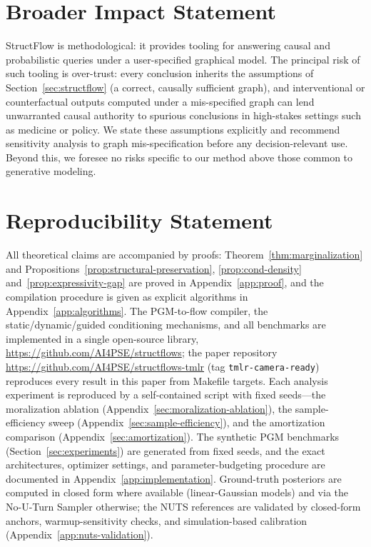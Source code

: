 \documentclass{article}
\theoremstyle{plain}
\theoremstyle{definition}
\theoremstyle{remark}
\newif\ifmarkcam \markcamtrue
\newcommand{\cam}[1]{\ifmarkcam{\color{camgreen}#1}\else#1\fi}
\begin{document}







\section*{Broader Impact Statement}

StructFlow is methodological: it provides tooling for answering causal and probabilistic queries under a user-specified graphical model. The principal risk of such tooling is over-trust: every conclusion inherits the assumptions of Section~\ref{sec:structflow} (a correct, causally sufficient graph), and interventional or counterfactual outputs computed under a mis-specified graph can lend unwarranted causal authority to spurious conclusions in high-stakes settings such as medicine or policy. We state these assumptions explicitly and recommend sensitivity analysis to graph mis-specification before any decision-relevant use. Beyond this, we foresee no risks specific to our method above those common to generative modeling.

\section*{Reproducibility Statement}

All theoretical claims are accompanied by proofs: Theorem~\ref{thm:marginalization} and Propositions~\ref{prop:structural-preservation}, \ref{prop:cond-density} and~\ref{prop:expressivity-gap} are proved in Appendix~\ref{app:proof}, and the compilation procedure is given as explicit algorithms in Appendix~\ref{app:algorithms}. The PGM-to-flow compiler, the static/dynamic/guided conditioning mechanisms, and all benchmarks are implemented in a single open-source library\cam{, \url{https://github.com/AI4PSE/structflows}; the paper repository \url{https://github.com/AI4PSE/structflows-tmlr} (tag \texttt{tmlr-camera-ready}) reproduces every result in this paper from Makefile targets}. Each analysis experiment is reproduced by a self-contained script with fixed seeds---the moralization ablation (Appendix~\ref{sec:moralization-ablation}), the sample-efficiency sweep (Appendix~\ref{sec:sample-efficiency}), and the amortization comparison (Appendix~\ref{sec:amortization}). The synthetic PGM benchmarks (Section~\ref{sec:experiments}) are generated from fixed seeds, and the exact architectures, optimizer settings, and parameter-budgeting procedure are documented in Appendix~\ref{app:implementation}. Ground-truth posteriors are computed in closed form where available (linear-Gaussian models) and via the No-U-Turn Sampler otherwise; the NUTS references are validated by closed-form anchors, warmup-sensitivity checks, and simulation-based calibration (Appendix~\ref{app:nuts-validation}).
\end{document}
